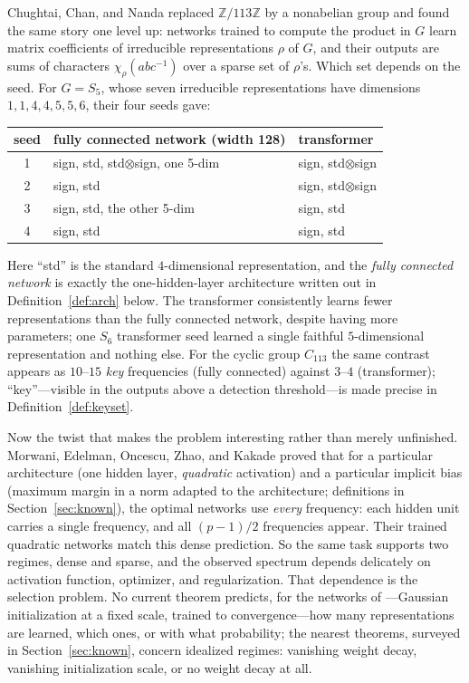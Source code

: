 \documentclass[11pt]{amsart}
\theoremstyle{plain}
\theoremstyle{definition}
\newcommand{\Z}{\mathbb{Z}}
\begin{document}
Chughtai, Chan, and Nanda \cite{chughtai2023} replaced $\Z/113\Z$ by a nonabelian group and found the same story one level up: networks trained to compute the product in $G$ learn matrix coefficients of irreducible representations $\rho$ of $G$, and their outputs are sums of characters $\chi_\rho(abc^{-1})$ over a sparse set of $\rho$'s. Which set depends on the seed. For $G = S_5$, whose seven irreducible representations have dimensions $1,1,4,4,5,5,6$, their four seeds gave:

\begin{center}
\begin{tabular}{c|l|l}
seed & fully connected network (width 128) & transformer \\
\hline
1 & sign, std, std$\otimes$sign, one 5-dim & sign, std$\otimes$sign \\
2 & sign, std & sign, std$\otimes$sign \\
3 & sign, std, the other 5-dim & sign, std \\
4 & sign, std & sign, std \\
\end{tabular}
\end{center}

\noindent Here ``std'' is the standard $4$-dimensional representation, and the \emph{fully connected network} is exactly the one-hidden-layer architecture written out in Definition~\ref{def:arch} below. The transformer consistently learns fewer representations than the fully connected network, despite having more parameters; one $S_6$ transformer seed learned a single faithful $5$-dimensional representation and nothing else. For the cyclic group $C_{113}$ the same contrast appears as $10$--$15$ \emph{key} frequencies (fully connected) against $3$--$4$ (transformer); ``key''---visible in the outputs above a detection threshold---is made precise in Definition~\ref{def:keyset}.

Now the twist that makes the problem interesting rather than merely unfinished. Morwani, Edelman, Oncescu, Zhao, and Kakade \cite{morwani2024} proved that for a particular architecture (one hidden layer, \emph{quadratic} activation) and a particular implicit bias (maximum margin in a norm adapted to the architecture; definitions in Section~\ref{sec:known}), the optimal networks use \emph{every} frequency: each hidden unit carries a single frequency, and all $(p-1)/2$ frequencies appear. Their trained quadratic networks match this dense prediction. So the same task supports two regimes, dense and sparse, and the observed spectrum depends delicately on activation function, optimizer, and regularization. That dependence is the selection problem. No current theorem predicts, for the networks of \cite{nanda2023,chughtai2023}---Gaussian initialization at a fixed scale, trained to convergence---how many representations are learned, which ones, or with what probability; the nearest theorems, surveyed in Section~\ref{sec:known}, concern idealized regimes: vanishing weight decay, vanishing initialization scale, or no weight decay at all.
\end{document}
